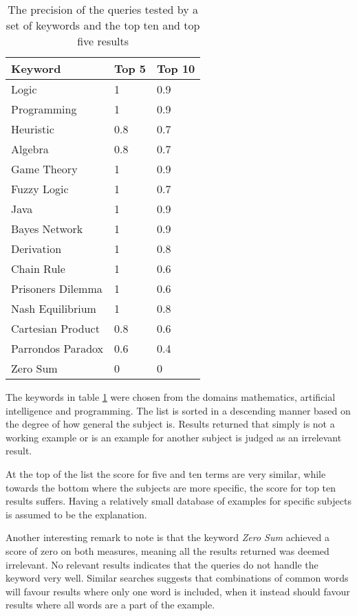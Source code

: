 
\begin{table}[h!]
\centering
\begin{tabular} {|| p{15em} | p{5em} | p{5em} ||} 
 \hline
 Keyword & Top 5 & Top 10 \\ [0.5ex] 
 \hline

Logic & 1 & 0.9 \\
Programming & 1 & 0.9 \\
Heuristic & 0.8 & 0.7 \\
Algebra & 0.8 & 0.7 \\
Game Theory & 1 & 0.9 \\

Fuzzy Logic & 1 & 0.7 \\
Java & 1 & 0.9 \\
Bayes Network & 1 & 0.9 \\
Derivation & 1 & 0.8 \\

Chain Rule & 1 & 0.6 \\
Prisoners Dilemma & 1 & 0.6 \\
Nash Equilibrium & 1 & 0.8 \\
Cartesian Product & 0.8 & 0.6 \\
Parrondos Paradox & 0.6 & 0.4 \\
Zero Sum & 0 & 0 \\

 \hline
\end{tabular}
\caption{The precision of the queries tested by a set of keywords and the top ten and top five results}
\label{table:precision_test}
\end{table}

The keywords in table \ref{table:precision_test} were chosen from the domains mathematics, artificial intelligence and programming. The list is sorted in a descending manner based on the degree of how general the subject is.
Results returned that simply is not a working example or is an example for another subject is judged as an irrelevant result.

At the top of the list the score for five and ten terms are very similar, while towards the bottom where the subjects are more specific, the score for top ten results suffers. Having a relatively small database of examples for specific subjects is assumed to be the explanation.

Another interesting remark to note is that the keyword \textit{Zero Sum} achieved a score of zero on both measures, meaning all the results returned was deemed irrelevant. No relevant results indicates that the queries do not handle the keyword very well. Similar searches suggests that combinations of common words will favour results where only one word is included, when it instead should favour results where all words are a part of the example.


\cleardoublepage